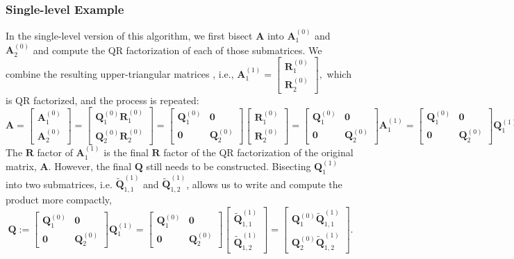 \documentclass[review,onefignum,onetabnum]{siamart190516}
\newcommand{\bb}[1]{\mathbf{#1}}
\begin{document}
		\subsubsection{Single-level Example}
		\label{Qdetails}
		In the single-level version of this algorithm, we first bisect $\bb{A}$  into $\bb{A}_1^{(0)}$ and $\bb{A}_2^{(0)}$ and compute the QR factorization of each of those submatrices.
		We combine the resulting upper-triangular matrices , i.e.,  \(\bb{A}_{1}^{(1)} =\begin{bmatrix}
		\bb{R}_{1}^{(0)}\\ 
		\bb{R}_{2}^{(0)} 
		\end{bmatrix},\)   which is QR factorized, and the process is repeated:
		\[
		\bb{A} = \begin{bmatrix}
		\bb{A}_1^{(0)}\\
		\bb{A}_2^{(0)}
		\end{bmatrix} = \begin{bmatrix}
		\bb{Q}_1^{(0)}\bb{R}_1^{(0)}\\
		\bb{Q}_2^{(0)}\bb{R}_2^{(0)}
		\end{bmatrix} = \begin{bmatrix}
		\bb{Q}_1^{(0)} & \bb{0}\\
		\bb{0} & \bb{Q}_2^{(0)}
		\end{bmatrix} \begin{bmatrix}
		\bb{R}_1^{(0)} \\
		\bb{R}_2^{(0)}
		\end{bmatrix} =\begin{bmatrix}
		\bb{Q}_1^{(0)} & \bb{0}\\
		\bb{0} & \bb{Q}_2^{(0)}
		\end{bmatrix} \bb{A}_1^{(1)} =\begin{bmatrix}
		\bb{Q}_1^{(0)} & \bb{0}\\
		\bb{0} & \bb{Q}_2^{(0)}
		\end{bmatrix} \bb{Q}_1^{(1)}\bb{R}.%
		\] 
		The $\bb{R}$ factor of $\bb{A}_1^{(1)}$ is the final $\bb{R}$ factor of the QR factorization of the original matrix, $\bb{A}$. 
		However, the final $\bb{Q}$ still needs to be constructed.
		Bisecting  $\bb{Q}_1^{(1)}$ into two submatrices, i.e. $\tilde{\bb{Q}}_{1,1}^{(1)}$ and $\tilde{\bb{Q}}_{1,2}^{(1)}$, allows us to write and compute the product more compactly,  \[
	    \bb{Q}:=\begin{bmatrix}
		\bb{Q}_1^{(0)} & \bb{0}\\
		\bb{0} & \bb{Q}_2^{(0)}
		\end{bmatrix} \bb{Q}_1^{(1)} =    \begin{bmatrix}
		\bb{Q}_1^{(0)} & \bb{0}\\
		\bb{0} & \bb{Q}_2^{(0)}
		\end{bmatrix} \begin{bmatrix}
		\tilde{\bb{Q}}_{1,1}^{(1)}\\
		\tilde{\bb{Q}}_{1,2}^{(1)}
		\end{bmatrix}= \begin{bmatrix}
		\bb{Q}_1^{(0)}\tilde{\bb{Q}}_{1,1}^{(1)} \\ 
		\bb{Q}_2^{(0)}\tilde{\bb{Q}}_{1,2}^{(1)}
		\end{bmatrix}. \]
\end{document}
